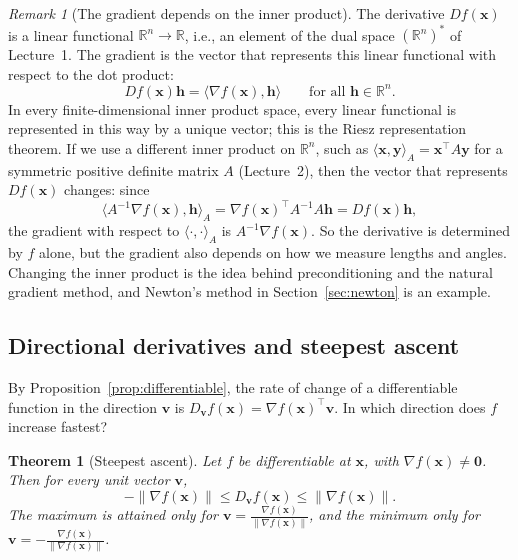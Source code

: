 \documentclass[11pt]{article}
\newcommand{\norm}[1]{\lVert #1 \rVert}
\newcommand{\ip}[2]{\langle #1, #2 \rangle}
\theoremstyle{definition}
\theoremstyle{plain}
\newtheorem{theorem}[definition]{Theorem}
\theoremstyle{remark}
\newtheorem{remark}[definition]{Remark}
\begin{document}
\begin{remark}[The gradient depends on the inner product]\label{rem:riesz}
    The derivative $Df(\mathbf{x})$ is a linear functional $\mathbb{R}^n \to \mathbb{R}$, i.e., an element of the dual space $(\mathbb{R}^n)^*$ of Lecture~1. The gradient is the vector that represents this linear functional with respect to the dot product:
    \[Df(\mathbf{x})\mathbf{h} = \ip{\nabla f(\mathbf{x})}{\mathbf{h}} \qquad \text{for all } \mathbf{h} \in \mathbb{R}^n.\]
    In every finite-dimensional inner product space, every linear functional is represented in this way by a unique vector; this is the Riesz representation theorem. If we use a different inner product on $\mathbb{R}^n$, such as $\ip{\mathbf{x}}{\mathbf{y}}_A = \mathbf{x}^\top A \mathbf{y}$ for a symmetric positive definite matrix $A$ (Lecture~2), then the vector that represents $Df(\mathbf{x})$ changes: since
    \[\ip{A^{-1} \nabla f(\mathbf{x})}{\mathbf{h}}_A = \nabla f(\mathbf{x})^\top A^{-1} A \mathbf{h} = Df(\mathbf{x})\mathbf{h},\]
    the gradient with respect to $\ip{\cdot}{\cdot}_A$ is $A^{-1} \nabla f(\mathbf{x})$. So the derivative is determined by $f$ alone, but the gradient also depends on how we measure lengths and angles. Changing the inner product is the idea behind preconditioning and the natural gradient method, and Newton's method in Section~\ref{sec:newton} is an example.
\end{remark}

\subsection{Directional derivatives and steepest ascent}

By Proposition~\ref{prop:differentiable}, the rate of change of a differentiable function in the direction $\mathbf{v}$ is $D_{\mathbf{v}} f(\mathbf{x}) = \nabla f(\mathbf{x})^\top \mathbf{v}$. In which direction does $f$ increase fastest?

\begin{theorem}[Steepest ascent]\label{thm:steepest}
    Let $f$ be differentiable at $\mathbf{x}$, with $\nabla f(\mathbf{x}) \neq \mathbf{0}$. Then for every unit vector $\mathbf{v}$,
    \[-\norm{\nabla f(\mathbf{x})} \leq D_{\mathbf{v}} f(\mathbf{x}) \leq \norm{\nabla f(\mathbf{x})}.\]
    The maximum is attained only for $\mathbf{v} = \frac{\nabla f(\mathbf{x})}{\norm{\nabla f(\mathbf{x})}}$, and the minimum only for $\mathbf{v} = -\frac{\nabla f(\mathbf{x})}{\norm{\nabla f(\mathbf{x})}}$.
\end{theorem}
\end{document}
